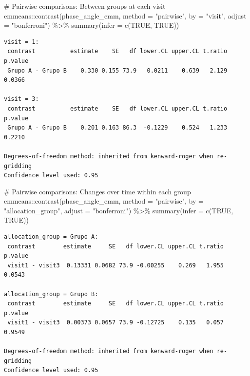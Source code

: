 \documentclass[
  letterpaper,
  DIV=11,
  numbers=noendperiod]{scrartcl}
\newenvironment{Shaded}{\begin{snugshade}}{\end{snugshade}}
\newcommand{\AttributeTok}[1]{\textcolor[rgb]{0.40,0.45,0.13}{#1}}
\newcommand{\CommentTok}[1]{\textcolor[rgb]{0.37,0.37,0.37}{#1}}
\newcommand{\ConstantTok}[1]{\textcolor[rgb]{0.56,0.35,0.01}{#1}}
\newcommand{\FunctionTok}[1]{\textcolor[rgb]{0.28,0.35,0.67}{#1}}
\newcommand{\NormalTok}[1]{\textcolor[rgb]{0.00,0.23,0.31}{#1}}
\newcommand{\SpecialCharTok}[1]{\textcolor[rgb]{0.37,0.37,0.37}{#1}}
\newcommand{\StringTok}[1]{\textcolor[rgb]{0.13,0.47,0.30}{#1}}
\begin{document}
\begin{Shaded}
\begin{Highlighting}[]
\CommentTok{\# Pairwise comparisons: Between groups at each visit}
\NormalTok{emmeans}\SpecialCharTok{::}\FunctionTok{contrast}\NormalTok{(phase\_angle\_emm, }\AttributeTok{method =} \StringTok{"pairwise"}\NormalTok{, }\AttributeTok{by =} \StringTok{"visit"}\NormalTok{, }\AttributeTok{adjust =} \StringTok{"bonferroni"}\NormalTok{) }\SpecialCharTok{\%\textgreater{}\%} \FunctionTok{summary}\NormalTok{(}\AttributeTok{infer =} \FunctionTok{c}\NormalTok{(}\ConstantTok{TRUE}\NormalTok{, }\ConstantTok{TRUE}\NormalTok{))}
\end{Highlighting}
\end{Shaded}

\begin{verbatim}
visit = 1:
 contrast          estimate    SE   df lower.CL upper.CL t.ratio p.value
 Grupo A - Grupo B    0.330 0.155 73.9   0.0211    0.639   2.129  0.0366

visit = 3:
 contrast          estimate    SE   df lower.CL upper.CL t.ratio p.value
 Grupo A - Grupo B    0.201 0.163 86.3  -0.1229    0.524   1.233  0.2210

Degrees-of-freedom method: inherited from kenward-roger when re-gridding 
Confidence level used: 0.95 
\end{verbatim}

\begin{Shaded}
\begin{Highlighting}[]
\CommentTok{\# Pairwise comparisons: Changes over time within each group}
\NormalTok{emmeans}\SpecialCharTok{::}\FunctionTok{contrast}\NormalTok{(phase\_angle\_emm, }\AttributeTok{method =} \StringTok{"pairwise"}\NormalTok{, }\AttributeTok{by =} \StringTok{"allocation\_group"}\NormalTok{, }\AttributeTok{adjust =} \StringTok{"bonferroni"}\NormalTok{) }\SpecialCharTok{\%\textgreater{}\%} \FunctionTok{summary}\NormalTok{(}\AttributeTok{infer =} \FunctionTok{c}\NormalTok{(}\ConstantTok{TRUE}\NormalTok{, }\ConstantTok{TRUE}\NormalTok{))}
\end{Highlighting}
\end{Shaded}

\begin{verbatim}
allocation_group = Grupo A:
 contrast        estimate     SE   df lower.CL upper.CL t.ratio p.value
 visit1 - visit3  0.13331 0.0682 73.9 -0.00255    0.269   1.955  0.0543

allocation_group = Grupo B:
 contrast        estimate     SE   df lower.CL upper.CL t.ratio p.value
 visit1 - visit3  0.00373 0.0657 73.9 -0.12725    0.135   0.057  0.9549

Degrees-of-freedom method: inherited from kenward-roger when re-gridding 
Confidence level used: 0.95 
\end{verbatim}
\end{document}
